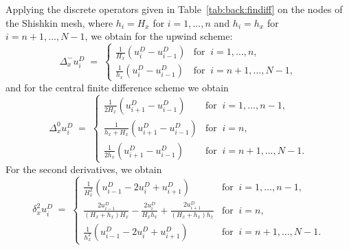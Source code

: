Applying the discrete operators given in Table~\ref{tab:back:findiff} on the
nodes of the Shishkin mesh, where $h_i=H_x$ for $i=1,\ldots,n$ and $h_i=h_{x}$
for $i=n+1,\ldots,N-1$, we obtain for the upwind scheme:
\begin{equation}
\Delta^{-}_{x} u_{i}^D\; =\;
\begin{cases}
\frac{1}{H_x}\left(u_{i}^D-u_{i-1}^D\right) & \mbox{for}\;\; i=1,\ldots, n, \\
\frac{1}{h_x}\left(u_{i}^D-u_{i-1}^D\right) & \mbox{for}\;\; i={n+1},\ldots, N-1,
\end{cases}
\end{equation}
and for the central finite difference scheme we obtain
\begin{equation}
\Delta^{0}_{x} u_{i}^D\; =\;
\begin{cases}
\frac{1}{2H_x}\left(u_{i+1}^D-u_{i-1}^D\right) &
\mbox{for}\;\; i=1,\ldots, {n-1},\\
\frac{1}{h_x+H_x}\left(u_{i+1}^D-u_{i-1}^D\right)  &
\mbox{for}\;\; i=n,\\
\frac{1}{2h_x}\left(u_{i+1}^D-u_{i-1}^D\right)  &
\mbox{for}\;\;i={n+1},\ldots, {N-1}.
\end{cases}
\end{equation}
For the second derivatives, we obtain
\begin{equation}
\label{eq:back:second}
\delta^{2}_{x} u_{i}^D\; =\;
\begin{cases}
\frac{1}{H_x^2}\left(u_{i-1}^D - 2u_{i}^D + u_{i+1}^D\right) &
\mbox{for}\;\; i=1,\ldots, {n-1},\\
\frac{2u_{i-1}^D}{(H_x+h_x)H_x} - \frac{2u_{i}^D}{H_xh_x} + \frac{2u_{i+1}^D}{(H_x+h_x)h_x} &
\mbox{for}\;\; i=n,\\
\frac{1}{h_x^2}\left(u_{i-1}^D - 2u_{i}^D + u_{i+1}^D\right) &
\mbox{for}\;\;i={n+1},\ldots, {N-1}.
\end{cases}
\end{equation}


